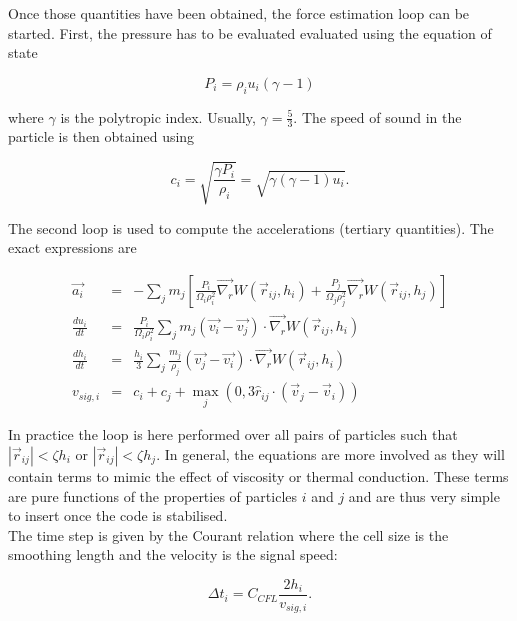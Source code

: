 \documentclass[a4paper,10pt]{report}
\begin{document}
Once those quantities have been obtained, the force estimation loop can be started.
First, the pressure has to be evaluated evaluated using the equation of state

\begin{equation}
\label{eq:pressure}
 P_i = \rho_i u_i (\gamma - 1)
\end{equation}

where $\gamma$ is the polytropic index. Usually, $\gamma = \frac{5}{3}$. The speed of sound in the particle is then
obtained using

\begin{equation}
 c_i = \sqrt{\frac{\gamma P_i}{\rho_i}} = \sqrt{\gamma (\gamma-1)u_i}.
\end{equation}

The second loop is used to compute the accelerations (tertiary quantities). The exact expressions are

\begin{eqnarray}
 \vec{a_i} &=& - \sum_j m_j\left[\frac{P_i}{\Omega_i\rho_i^2}\vec{\nabla_r} W(\vec{r}_{ij}, h_i) +
\frac{P_j}{\Omega_j\rho_j^2}\vec{\nabla_r}W(\vec{r}_{ij}, h_j) \right] \label{eq:acceleration}\\
 \frac{du_i}{dt} &=& \frac{P_i}{\Omega_i\rho_i^2} \sum_j m_j
(\vec{v_i}-\vec{v_j})\cdot\vec{\nabla_r} W(\vec{r}_{ij}, h_i)
\label{eq:dudt}\\
 \frac{dh_i}{dt} &=& \frac{h_i}{3}\sum_j \frac{m_j}{\rho_j} \left(\vec{v_j} - \vec{v_i} \right)
\cdot\vec{\nabla_r}W(\vec{r}_{ij}, h_i)\\
 v_{sig,i} &=& c_i + c_j + \max_j(0, 3\hat{r}_{ij} \cdot (\vec{v}_j - \vec{v}_i)) \label{eq:sigvel}
\end{eqnarray}

In practice the loop is here performed over all pairs of particles such that $|\vec{r}_{ij}| < \zeta h_i$ or
$|\vec{r}_{ij}| < \zeta
h_j$. In general, the equations are more involved as they will contain terms to mimic the effect of viscosity or
thermal conduction. These terms are pure functions of the properties of particles $i$ and $j$ and are thus very simple
to insert once the code is stabilised.\\

The time step is given by the Courant relation where the cell size is the smoothing length and the velocity is the
signal speed:

\begin{equation}
 \Delta t_i = C_{CFL} \frac{2h_i}{v_{sig,i}}.
\label{eq:dt}
\end{equation}
\end{document}
